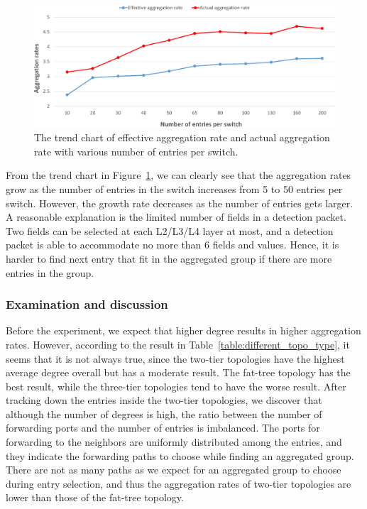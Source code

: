 \documentclass[conference]{IEEEtran}
\begin{document}
\begin{figure}[ht]
\centering
\includegraphics[width=1\linewidth]{figures/exp_entrynum_trend.pdf}
\caption{The trend chart of effective aggregation rate and actual aggregation rate with various number of entries per switch.}
\label{exp_entrynum_trend}
\end{figure}

From the trend chart in Figure~\ref{exp_entrynum_trend}, we can clearly see that the aggregation rates grow as the number of entries in the switch increases from 5 to 50 entries per switch. However, the growth rate decreases as the number of entries gets larger. A reasonable explanation is the limited number of fields in a detection packet. Two fields can be selected at each L2/L3/L4 layer at most, and a detection packet is able to accommodate no more than 6 fields and values. Hence, it is harder to find next entry that fit in the aggregated group if there are more entries in the group.

\subsubsection{Examination and discussion}
\label{examination_and_discussion}

Before the experiment, we expect that higher degree results in higher aggregation rates. However, according to the result in Table~\ref{table:different_topo_type}, it seems that it is not always true, since the two-tier topologies have the highest average degree overall but has a moderate result. The fat-tree topology has the best result, while the three-tier topologies tend to have the worse result. After tracking down the entries inside the two-tier topologies, we discover that although the number of degrees is high, the ratio between the number of forwarding ports and the number of entries is imbalanced. The ports for forwarding to the neighbors are uniformly distributed among the entries, and they indicate the forwarding paths to choose while finding an aggregated group. There are not as many paths as we expect for an aggregated group to choose during entry selection, and thus the aggregation rates of two-tier topologies are lower than those of the fat-tree topology. 
\end{document}
